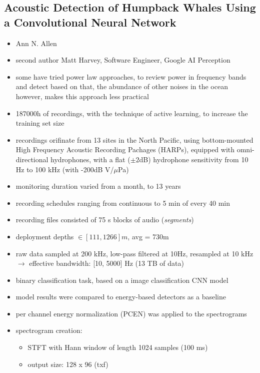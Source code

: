 \documentclass[12pt,a4paper]{article}
\begin{document}
\subsection{Acoustic Detection of Humpback Whales Using a Convolutional Neural Network} %
\label{sub:acoustic_detection_of_humpback_whales_using_a_convolutional_neural_network}
\begin{itemize}
  \item Ann N. Allen \cite{allen_convolutional_2021}
  \item second author Matt Harvey, Software Engineer, Google AI Perception 
  \item some have tried power law approaches, to review power in frequency bands and detect based on that, the abundance of other noises in the ocean however, makes this approach less practical
  \item 187000h of recordings, with the technique of active learning, to increase the training set size
  \item recordings orifinate from 13 sites in the North Pacific, using bottom-mounted High Frequency Acoustic Recording Pachages (HARPs), equipped with omni-directional hydrophones, with a flat ($\pm 2$dB) hydrophone sensitivity from 10 Hz to 100 kHz (with -200dB V/$\mu$Pa)
  \item monitoring duration varied from a month, to 13 years
  \item recording schedules ranging from continuous to 5 min of every 40 min
  \item recording files consisted of 75 s blocks of audio (\textit{segments})
  \item deployment depths $\in [111, 1266]m$, avg = 730m
  \item raw data sampled at 200 kHz, low-pass filtered at 10Hz, resampled at 10 kHz
  \newline \indent $\longrightarrow$ effective bandwidth: [10, 5000] Hz (13 TB of data)
  \item binary classification task, based on a image classification CNN model
  \item model results were compared to energy-based detectors as a baseline
  \item per channel energy normalization (PCEN) was applied to the spectrograms 
  \item spectrogram creation:
  \begin{itemize}
    \item STFT with Hann window of length 1024 samples (100 ms)
    \item output size: 128 x 96 (txf)

\end{itemize}
\end{itemize}
\end{document}
